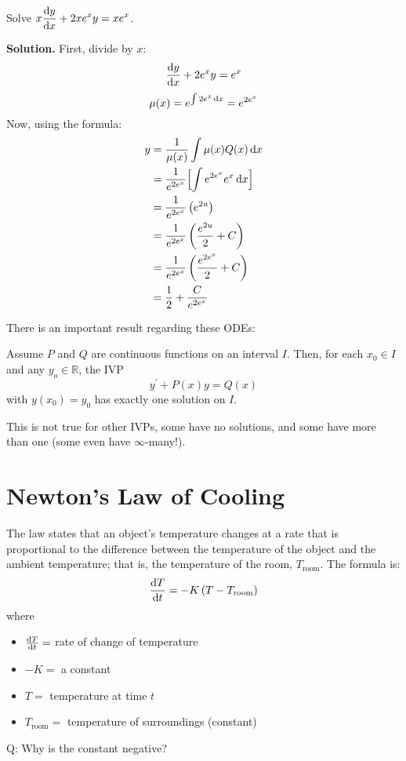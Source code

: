 \begin{Example}{}{}
    Solve $ \displaystyle  x \odv{y}{x} +2xe^x y=xe^x $.

    \textbf{Solution.}
    First, divide by $ x $:
    \[ \odv{y}{x}+2e^x y=e^x \]
    \[ \mu(x)=e^{\int 2e^x\odif{x}}=e^{2e^x} \]
    Now, using the formula:
    \begin{align*}
        y
         & =\frac{1}{\mu(x)}\int \mu(x)Q(x)\odif{x}                 \\
         & =\frac{1}{e^{2e^x}}\Bigl[\int e^{2e^x}e^x\odif{x} \Bigr] \\
         & =\frac{1}{e^{2e^x}} \left(e^{2u}\right)                  \\
         & =\frac{1}{e^{2e^x}}\left( \frac{e^{2u}}{2} +C \right)    \\
         & =\frac{1}{e^{2e^x}}\left( \frac{e^{2e^x}}{2} +C \right)  \\
         & =\frac{1}{2} +\frac{C}{e^{2e^x}}
    \end{align*}
\end{Example}

There is an important result regarding these ODEs:
\begin{Theorem}{}{}
    Assume $ P $ and $ Q $ are continuous functions on an interval $ I $.
    Then, for each $ x_0\in I $ and any $ y_o\in\mathbb{R} $, the IVP
    \[ y^\prime +P(x)y=Q(x) \]
    with $ y(x_0)=y_0 $ has exactly one solution on $ I $.
\end{Theorem}

\begin{Remark}{}{}
    This is not true for other IVPs, some have no solutions, and some have more than
    one (some even have $ \infty $-many!).
\end{Remark}

\setcounter{section}{6}
\section{Newton's Law of Cooling}
The law states that an object's temperature changes at a rate that is proportional
to the difference between the temperature of
the object and the ambient temperature; that is, the temperature of the room,
$ T_{\text{room}} $. The formula is:
\[ \odv{T}{t}=-K\left( T-T_{\text{room}} \right)  \]
where
\begin{itemize}
    \item $ \odv{T}{t} = $ rate of change of temperature
    \item $ -K =$ a constant
    \item $ T= $ temperature at time $ t $
    \item $ T_{\text{room}}= $ temperature of surroundings (constant)
\end{itemize}
Q\@: Why is the constant negative?

